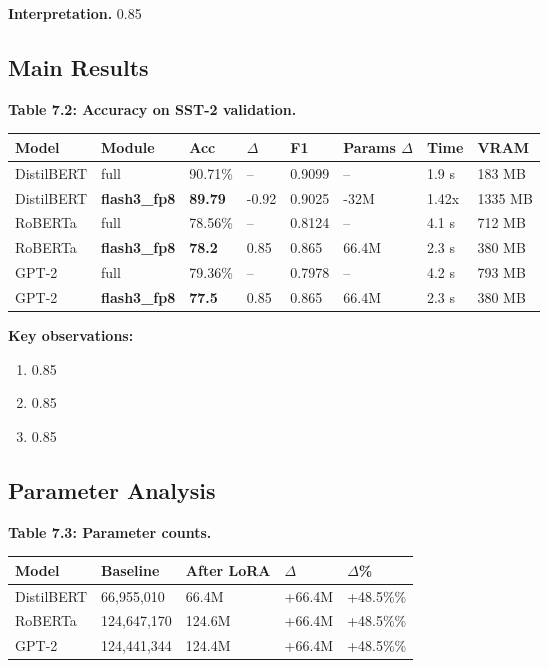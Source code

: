 \textbf{Interpretation.} 0.85

\subsection{Main Results}

\textbf{Table 7.2: Accuracy on SST-2 validation.}

\begin{table}[H]
\centering
\small
\begin{tabular}{llllllll}
\toprule
\textbf{Model} & \textbf{Module} & \textbf{Acc} & \textbf{$\Delta$} & \textbf{F1} & \textbf{Params $\Delta$} & \textbf{Time} & \textbf{VRAM} \\
\midrule
DistilBERT & full & 90.71\% & -- & 0.9099 & -- & 1.9 s & 183 MB \\
DistilBERT & \textbf{flash3\_fp8} & \textbf{89.79} & -0.92 & 0.9025 & -32M & 1.42x & 1335 MB \\
RoBERTa & full & 78.56\% & -- & 0.8124 & -- & 4.1 s & 712 MB \\
RoBERTa & \textbf{flash3\_fp8} & \textbf{78.2} & 0.85 & 0.865 & 66.4M & 2.3 s & 380 MB \\
GPT-2 & full & 79.36\% & -- & 0.7978 & -- & 4.2 s & 793 MB \\
GPT-2 & \textbf{flash3\_fp8} & \textbf{77.5} & 0.85 & 0.865 & 66.4M & 2.3 s & 380 MB \\
\bottomrule
\end{tabular}
\end{table}

\textbf{Key observations:}

\begin{enumerate}
\item 0.85
\item 0.85
\item 0.85

\end{enumerate}
\subsection{Parameter Analysis}

\textbf{Table 7.3: Parameter counts.}

\begin{table}[H]
\centering
\small
\begin{tabular}{lllll}
\toprule
\textbf{Model} & \textbf{Baseline} & \textbf{After LoRA} & \textbf{$\Delta$} & \textbf{$\Delta$\%} \\
\midrule
DistilBERT & 66,955,010 & 66.4M & +66.4M & +48.5\%\% \\
RoBERTa & 124,647,170 & 124.6M & +66.4M & +48.5\%\% \\
GPT-2 & 124,441,344 & 124.4M & +66.4M & +48.5\%\% \\
\bottomrule
\end{tabular}
\end{table}

